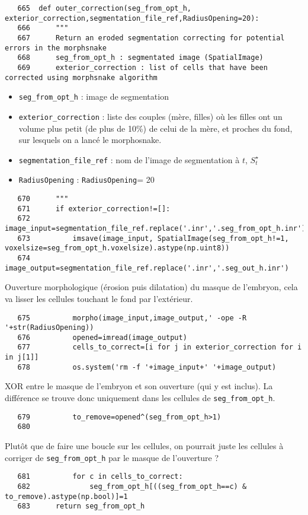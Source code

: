 \documentclass{article}
\def \mycolor {red}
\begin{document}
\begin{verbatim}
   665	def outer_correction(seg_from_opt_h, exterior_correction,segmentation_file_ref,RadiusOpening=20):
   666	    """
   667	    Return an eroded segmentation correcting for potential errors in the morphsnake
   668	    seg_from_opt_h : segmentated image (SpatialImage)
   669	    exterior_correction : list of cells that have been corrected using morphsnake algorithm
\end{verbatim}
\color{\mycolor}
\begin{itemize}
\itemsep -0.5ex
\item \verb|seg_from_opt_h| : image de segmentation
\item \verb|exterior_correction| : liste des couples (m\`ere, filles) o\`u les filles ont un volume plus petit (de plus de 10\%) de celui de la m\`ere, et proches du fond, sur lesquels on a lanc\'e le morphosnake.
\item \verb|segmentation_file_ref| : nom de l'image de segmentation \`a $t$, $S^{\star}_t$
\item \verb|RadiusOpening| : \verb|RadiusOpening|= 20
\end{itemize}
\color{black}
\begin{verbatim}
   670	    """
   671	    if exterior_correction!=[]:
   672	    	image_input=segmentation_file_ref.replace('.inr','.seg_from_opt_h.inr')
   673	        imsave(image_input, SpatialImage(seg_from_opt_h!=1, voxelsize=seg_from_opt_h.voxelsize).astype(np.uint8))
   674	        image_output=segmentation_file_ref.replace('.inr','.seg_out_h.inr')
\end{verbatim}
\color{\mycolor}
Ouverture morphologique (\'erosion puis dilatation) du masque de l'embryon, cela va lisser les cellules touchant le fond par l'ext\'erieur.
\color{black}
\begin{verbatim}
   675	        morpho(image_input,image_output,' -ope -R '+str(RadiusOpening))
   676	        opened=imread(image_output)
   677	        cells_to_correct=[i for j in exterior_correction for i in j[1]]
   678	        os.system('rm -f '+image_input+' '+image_output)
\end{verbatim}
\color{\mycolor}
XOR entre le masque de l'embryon et son ouverture (qui y est inclus). La diff\'erence se trouve donc uniquement dans les cellules de \verb|seg_from_opt_h|.
\color{black}
\begin{verbatim}
   679	        to_remove=opened^(seg_from_opt_h>1)
   680	        
\end{verbatim}
\color{\mycolor}
Plut\^ot que de faire une boucle sur les cellules, on pourrait juste les cellules \`a corriger de \verb|seg_from_opt_h| par le masque de l'ouverture ?
\color{black}
\begin{verbatim}
   681	        for c in cells_to_correct:
   682	            seg_from_opt_h[((seg_from_opt_h==c) & to_remove).astype(np.bool)]=1
   683	    return seg_from_opt_h
\end{verbatim}
\end{document}
